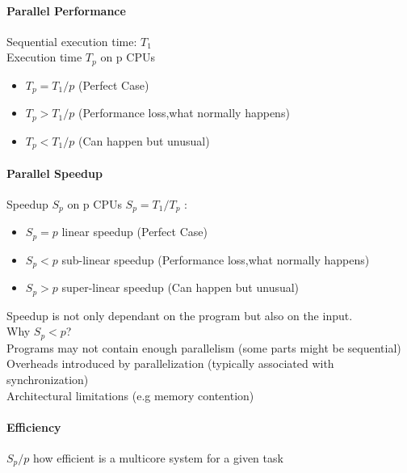 \documentclass[8pt]{extreport}
\begin{document}
\paragraph{Parallel Performance} Sequential execution time: $T_{1}$\\
Execution time $T_{p}$ on p CPUs
\begin{itemize}
\item $T_{p} = T_{1}/p$  (Perfect Case)
\item $T_{p} > T_{1}/p$  (Performance loss,what normally happens)
\item $T_{p} < T_{1}/p$  (Can happen but unusual)
\end{itemize}
\paragraph{Parallel Speedup}
Speedup $S_{p}$ on p CPUs $S_{p} = T_{1}/T_{p}$ :
\begin{itemize}
\item $S_{p} = p$ linear speedup (Perfect Case)
\item $S_{p} < p$ sub-linear speedup (Performance loss,what normally happens)
\item $S_{p} > p$ super-linear speedup (Can happen but unusual)
\end{itemize}
Speedup is not only dependant on the program but also on the input.\\
Why $S_{p} < p$?\\
Programs may not contain enough parallelism (some parts might be sequential)\\
Overheads introduced by parallelization (typically associated with synchronization)\\
Architectural limitations (e.g memory contention)\\


\paragraph{Efficiency} $S_{p}/p$ how efficient is a multicore system for a given task
\end{document}

